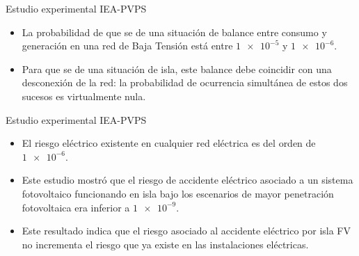 \documentclass[xcolor={usenames,svgnames,dvipsnames}]{beamer}
\begin{document}
\begin{frame}[label=sec-2-6-5]{Estudio experimental IEA-PVPS}
\begin{itemize}
\item La probabilidad de que se de una situación de balance entre consumo y
generación en una red de Baja Tensión está entre $\num{1e-5}$ y
$\num{1e-6}$.

\item Para que se de una situación de isla, este balance debe coincidir con
una desconexión de la red: la probabilidad de ocurrencia simultánea
de estos dos sucesos es virtualmente nula.
\end{itemize}
\end{frame}

\begin{frame}[label=sec-2-6-6]{Estudio experimental IEA-PVPS}
\begin{itemize}
\item El riesgo eléctrico existente en cualquier red eléctrica es del orden
de $\num{1e-6}$.

\item Este estudio mostró que el riesgo de accidente eléctrico asociado a
un sistema fotovoltaico funcionando en isla bajo los escenarios de
mayor penetración fotovoltaica era inferior a $\num{1e-9}$.

\item Este resultado indica que el riesgo asociado al accidente eléctrico
por isla FV no incrementa el riesgo que ya existe en las
instalaciones eléctricas.
\end{itemize}
\end{frame}
\end{document}
